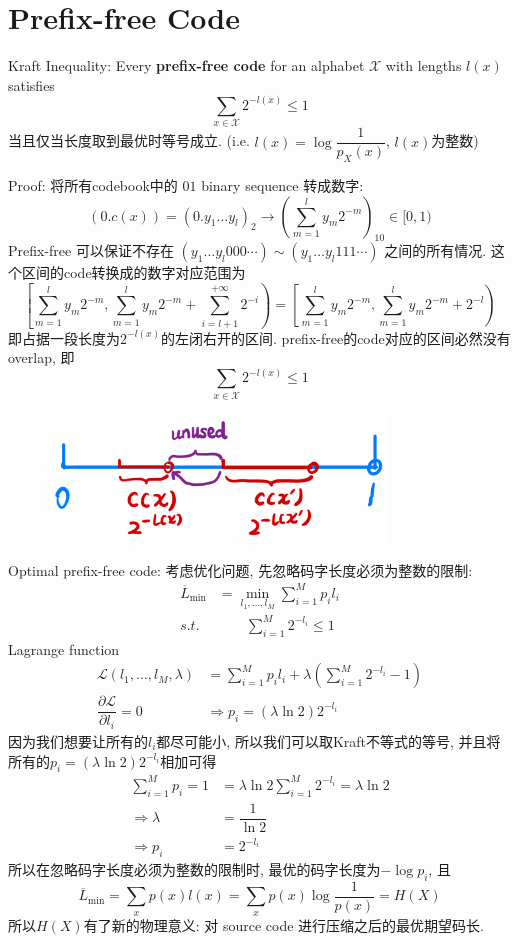 \section{Prefix-free Code}
\begin{theorem}
Kraft Inequality: Every \textbf{prefix-free code} for an alphabet $\mathcal{X}$ with lengths $l(x)$ satisfies
$$\sum_{x\in\mathcal{X}}2^{-l(x)}\leq 1$$
当且仅当长度取到最优时等号成立. (i.e. $l(x)=\log\dfrac{1}{p_X(x)}$, $l(x)$为整数)
\end{theorem}

Proof: 将所有codebook中的 $01$ binary sequence 转成数字:
$$(0.c(x))=\left(0.y_1\ldots y_l\right)_2\to \left(\sum\limits_{m=1}^ly_m2^{-m}\right)_{10}\in[0,1)$$
Prefix-free 可以保证不存在 $\left(y_1\ldots y_l000\cdots\right)\sim\left(y_1\ldots y_l111\cdots\right)$ 之间的所有情况. 这个区间的code转换成的数字对应范围为
$$\left[\sum_{m=1}^ly_m2^{-m},\sum_{m=1}^ly_m2^{-m}+\sum_{i=l+1}^{+\infty}2^{-i}\right)=\left[\sum_{m=1}^ly_m2^{-m},\sum_{m=1}^ly_m2^{-m}+2^{-l}\right)$$
即占据一段长度为$2^{-l(x)}$的左闭右开的区间. prefix-free的code对应的区间必然没有overlap, 即
$$\sum_{x\in\mathcal{X}}2^{-l(x)}\leq 1$$

\begin{figure}[htbp]
    \centering
    \includegraphics[width=0.8\textwidth]{./figures/chapter3/kraft_inequality.png}
\end{figure}

Optimal prefix-free code: 考虑优化问题, 先忽略码字长度必须为整数的限制:
\begin{align*}
\overline{L}_{\min} &= \min_{l_1,\ldots,l_M} \sum_{i=1}^M p_i l_i \\
s.t. &\qquad \sum_{i=1}^M 2^{-l_i} \leq 1
\end{align*}
Lagrange function
\begin{align*}
\mathcal{L}(l_1,\ldots,l_M,\lambda) &= \sum_{i=1}^M p_i l_i + \lambda \left(\sum_{i=1}^M 2^{-l_i} - 1\right) \\
\dfrac{\partial \mathcal{L}}{\partial l_i} = 0 &\Rightarrow p_i = \left(\lambda\ln 2\right) 2^{-l_i}
\end{align*}
因为我们想要让所有的$l_i$都尽可能小, 所以我们可以取Kraft不等式的等号, 并且将所有的$p_i = \left(\lambda\ln 2\right) 2^{-l_i}$相加可得
\begin{align*}
\sum_{i=1}^M p_i = 1 &= \lambda \ln 2 \sum_{i=1}^M 2^{-l_i} = \lambda \ln 2 \\
\Rightarrow \lambda &= \dfrac{1}{\ln 2} \\
\Rightarrow p_i &= 2^{-l_i}
\end{align*}
所以在忽略码字长度必须为整数的限制时, 最优的码字长度为$-\log p_i$, 且
$$\overline{L}_{\min} = \sum_{x}p(x)l(x)=\sum_{x}p(x)\log \dfrac{1}{p(x)} = H(X)$$
所以$H(X)$有了新的物理意义: 对 source code 进行压缩之后的最优期望码长.

